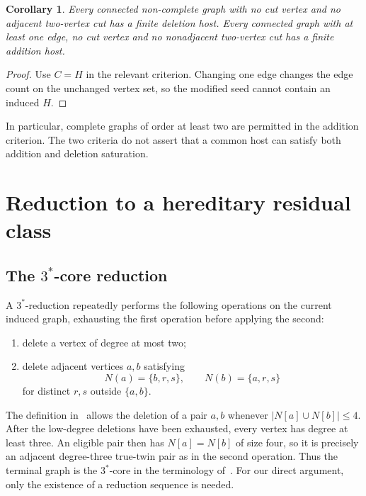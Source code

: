 \documentclass[11pt,reqno]{amsart}
\newtheorem{corollary}[theorem]{Corollary}
\theoremstyle{definition}
\theoremstyle{remark}
\begin{document}
\begin{corollary}\label{cor:whole-graph}
Every connected non-complete graph with no cut vertex and no adjacent two-vertex cut has a finite deletion host. Every connected graph with at least one edge, no cut vertex and no nonadjacent two-vertex cut has a finite addition host.
\end{corollary}
\begin{proof}
Use $C=H$ in the relevant criterion. Changing one edge changes the edge count on the unchanged vertex set, so the modified seed cannot contain an induced $H$.
\end{proof}

In particular, complete graphs of order at least two are permitted in the addition criterion. The two criteria do not assert that a common host can satisfy both addition and deletion saturation.

\section{Reduction to a hereditary residual class}\label{sec:core}

\subsection{The $3^{*}$-core reduction}

A $3^{*}$-reduction repeatedly performs the following operations on the current induced graph, exhausting the first operation before applying the second:
\begin{enumerate}
\item delete a vertex of degree at most two;
\item delete adjacent vertices $a,b$ satisfying
\[
 N(a)=\{b,r,s\},\qquad N(b)=\{a,r,s\}
\]
for distinct $r,s$ outside $\{a,b\}$.
\end{enumerate}
The definition in~\cite{BGJMS} allows the deletion of a pair $a,b$ whenever $|N[a]\cup N[b]|\le4$. After the low-degree deletions have been exhausted, every vertex has degree at least three. An eligible pair then has $N[a]=N[b]$ of size four, so it is precisely an adjacent degree-three true-twin pair as in the second operation. Thus the terminal graph is the $3^{*}$-core in the terminology of~\cite{BGJMS}. For our direct argument, only the existence of a reduction sequence is needed.
\end{document}
